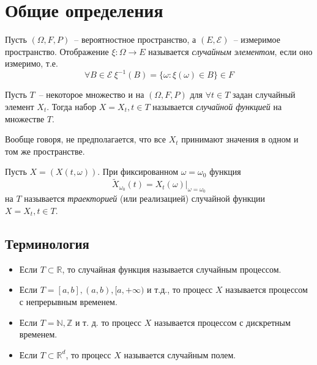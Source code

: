 

\ifdefined\Main\else

\fi

\section*{Общие определения}
\begin{definition}
Пусть $(\Omega, F, P)$~-- вероятностное пространство, а $(E, \mathcal{E})$~-- измеримое пространство.
Отображение $\xi: \Omega \rightarrow E$ называется \emph{случайным элементом}, если оно измеримо,
т.е. $$\forall B \in \mathcal{E}\ \xi^{-1}(B) = \{\omega: \xi(\omega) \in B\} \in F$$
\end{definition}
\begin{definition}
Пусть $T$~-- некоторое множество и на $(\Omega, F,P)$ для $\forall t\in T$ задан случайный элемент $X_t$. Тогда набор $X = {X_t, t \in T}$ называется \emph{случайной функцией} на множестве $T$.
\end{definition}

\begin{remark}
Вообще говоря, не предполагается, что все $X_t$ принимают значения в одном и том же пространстве.
\end{remark}

\begin{definition}
Пусть $X = (X(t, \omega))$. При фиксированном $\omega = \omega_0$ функция
$$\tilde{X}_{\omega_0}(t) = X_t(\omega) \vert _{\omega=\omega_0}$$
на $T$ называется \emph{траекторией} (или реализацией) случайной функции $X = {X_t, t\in T}$.
\end{definition}

\subsection{Терминология}
\begin{itemize}
\item Если $T \subset \mathbb{R}$, то случайная функция называется случайным процессом.
\item Если $T = [a, b], (a, b), [a, +\infty)$ и т.д., то процесс $X$ называется процессом с непрерывным временем.
\item Если $T = \mathbb{N}, \mathbb{Z}$ и т. д. то процесс $X$ называется процессом с дискретным временем.
\item Если $T \subset \mathbb{R}^d$, то процесс $X$ называется случайным полем.
\end{itemize}

